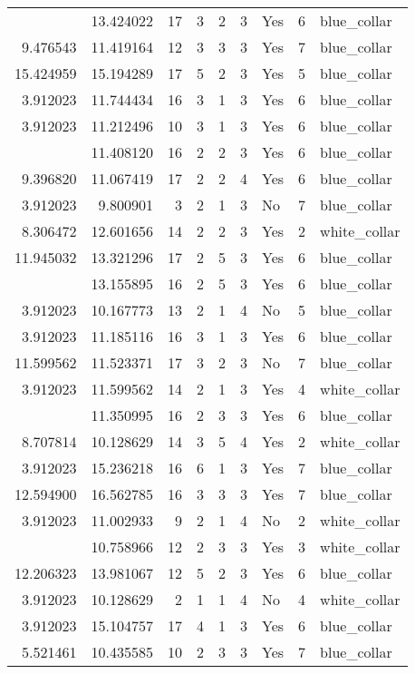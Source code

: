 \documentclass[
]{article}
\begin{document}
\begin{longtable}[t]{rrrrrllrl}
\addlinespace
7.673223 & 13.424022 & 17 & 3 & 2 & 3 & Yes & 6 & blue\_collar\\
9.476543 & 11.419164 & 12 & 3 & 3 & 3 & Yes & 7 & blue\_collar\\
15.424959 & 15.194289 & 17 & 5 & 2 & 3 & Yes & 5 & blue\_collar\\
3.912023 & 11.744434 & 16 & 3 & 1 & 3 & Yes & 6 & blue\_collar\\
3.912023 & 11.212496 & 10 & 3 & 1 & 3 & Yes & 6 & blue\_collar\\
\addlinespace
9.619133 & 11.408120 & 16 & 2 & 2 & 3 & Yes & 6 & blue\_collar\\
9.396820 & 11.067419 & 17 & 2 & 2 & 4 & Yes & 6 & blue\_collar\\
3.912023 & 9.800901 & 3 & 2 & 1 & 3 & No & 7 & blue\_collar\\
8.306472 & 12.601656 & 14 & 2 & 2 & 3 & Yes & 2 & white\_collar\\
11.945032 & 13.321296 & 17 & 2 & 5 & 3 & Yes & 6 & blue\_collar\\
\addlinespace
12.611704 & 13.155895 & 16 & 2 & 5 & 3 & Yes & 6 & blue\_collar\\
3.912023 & 10.167773 & 13 & 2 & 1 & 4 & No & 5 & blue\_collar\\
3.912023 & 11.185116 & 16 & 3 & 1 & 3 & Yes & 6 & blue\_collar\\
11.599562 & 11.523371 & 17 & 3 & 2 & 3 & No & 7 & blue\_collar\\
3.912023 & 11.599562 & 14 & 2 & 1 & 3 & Yes & 4 & white\_collar\\
\addlinespace
9.854822 & 11.350995 & 16 & 2 & 3 & 3 & Yes & 6 & blue\_collar\\
8.707814 & 10.128629 & 14 & 3 & 5 & 4 & Yes & 2 & white\_collar\\
3.912023 & 15.236218 & 16 & 6 & 1 & 3 & Yes & 7 & blue\_collar\\
12.594900 & 16.562785 & 16 & 3 & 3 & 3 & Yes & 7 & blue\_collar\\
3.912023 & 11.002933 & 9 & 2 & 1 & 4 & No & 2 & white\_collar\\
\addlinespace
6.956545 & 10.758966 & 12 & 2 & 3 & 3 & Yes & 3 & white\_collar\\
12.206323 & 13.981067 & 12 & 5 & 2 & 3 & Yes & 6 & blue\_collar\\
3.912023 & 10.128629 & 2 & 1 & 1 & 4 & No & 4 & white\_collar\\
3.912023 & 15.104757 & 17 & 4 & 1 & 3 & Yes & 6 & blue\_collar\\
5.521461 & 10.435585 & 10 & 2 & 3 & 3 & Yes & 7 & blue\_collar\\

\end{longtable}
\end{document}
